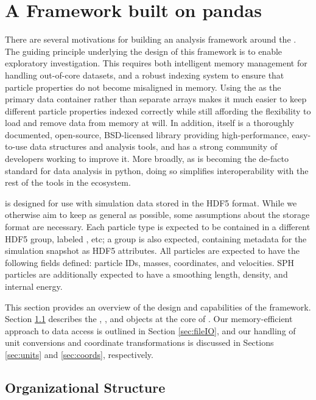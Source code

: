 \section{A Framework built on pandas}
\label{sec:framework}

There are several motivations for building an analysis framework around the . 
The guiding principle underlying the design of this framework is to enable exploratory investigation.
This requires both intelligent memory management for handling out-of-core datasets, and a robust indexing system to ensure that particle properties do not become misaligned in memory.
Using  the  as the primary data container rather than separate  arrays makes it much easier to keep different particle properties indexed correctly while still affording the flexibility to load and remove data from memory at will.
In addition,  itself is a thoroughly documented, open-source, BSD-licensed library providing high-performance, easy-to-use data structures and analysis tools, and has a strong community of developers working to improve it.  
More broadly, as  is becoming the de-facto standard for data analysis in python, doing so simplifies interoperability with the rest of the tools in the ecosystem.

 is designed for use with simulation data stored in the HDF5 format.  
While we otherwise aim to keep  as general as possible, some assumptions about the storage format are necessary.
Each particle type is expected to be contained in a different HDF5 group, labeled , etc; a  group is also expected, containing metadata for the simulation snapshot as HDF5 attributes. 
All particles are expected to have the following fields defined: particle IDs, masses, coordinates, and velocities.  
SPH particles are additionally expected to have a smoothing length, density, and internal energy.  

This section provides an overview of the design and capabilities of the  framework.  
Section \ref{sec:hierarchy} describes the , , and  objects at the core of .  
Our memory-efficient approach to data access is outlined in Section \ref{sec:fileIO}, and our handling of unit conversions and coordinate transformations is discussed in Sections \ref{sec:units} and \ref{sec:coords}, respectively.

\subsection{Organizational Structure}
\label{sec:hierarchy}

